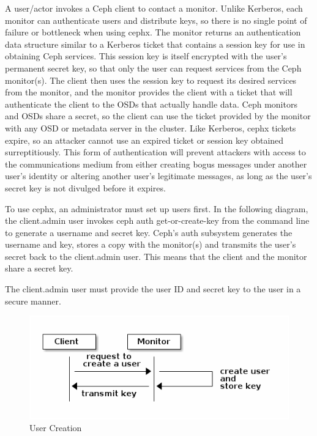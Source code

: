 \documentclass[12pt,a4paper]{report}
\begin{document}
A user/actor invokes a Ceph client to contact a monitor. Unlike Kerberos, each
monitor can authenticate users and distribute keys, so there is no single point
of failure or bottleneck when using cephx. The monitor returns an
authentication data structure similar to a Kerberos ticket that contains a
session key for use in obtaining Ceph services. This session key is itself
encrypted with the user’s permanent secret key, so that only the user can
request services from the Ceph monitor(s). The client then uses the session key
to request its desired services from the monitor, and the monitor provides the
client with a ticket that will authenticate the client to the OSDs that
actually handle data. Ceph monitors and OSDs share a secret, so the client can
use the ticket provided by the monitor with any OSD or metadata server in the
cluster. Like Kerberos, cephx tickets expire, so an attacker cannot use an
expired ticket or session key obtained surreptitiously. This form of
authentication will prevent attackers with access to the communications medium
from either creating bogus messages under another user’s identity or altering
another user’s legitimate messages, as long as the user’s secret key is not
divulged before it expires.

To use cephx, an administrator must set up users first. In the following
diagram, the client.admin user invokes ceph auth get-or-create-key from the
command line to generate a username and secret key. Ceph’s auth subsystem
generates the username and key, stores a copy with the monitor(s) and transmits
the user’s secret back to the client.admin user. This means that the client and
the monitor share a secret key.

The client.admin user must provide the user ID and secret key to the user in a
secure manner.

\begin{figure}[h]
	\includegraphics[scale=0.75]{create_user.png}
	\caption{User Creation}
	\label{fig:create_user}
\end{figure}
\end{document}
